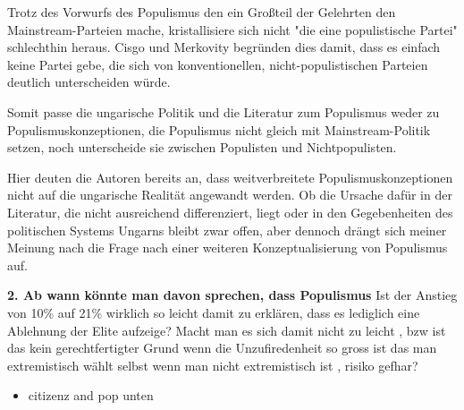 \documentclass[11pt]{report}
\begin{document}
Trotz des Vorwurfs des Populismus den ein Großteil der Gelehrten den Mainstream-Parteien mache, kristallisiere sich nicht "die eine populistische Partei" schlechthin heraus. Cisgo und Merkovity begründen dies damit, dass es einfach keine Partei gebe, die sich von konventionellen, nicht-populistischen Parteien deutlich unterscheiden würde.

Somit passe die ungarische Politik und die Literatur zum Populismus weder zu Populismuskonzeptionen, die Populismus nicht gleich mit Mainstream-Politik setzen, noch unterscheide sie zwischen Populisten und Nichtpopulisten.

Hier deuten die Autoren bereits an, dass weitverbreitete Populismuskonzeptionen nicht auf die ungarische Realität angewandt werden. Ob die Ursache dafür in der Literatur, die nicht ausreichend differenziert, liegt oder in den Gegebenheiten des politischen Systems Ungarns bleibt zwar offen, aber dennoch drängt sich meiner Meinung nach die Frage nach einer weiteren Konzeptualisierung von Populismus auf.


\textbf{2. Ab wann könnte man davon sprechen, dass Populismus} 
Ist der Anstieg von 10\% auf 21\% wirklich so leicht damit zu erklären, dass es lediglich eine Ablehnung der Elite aufzeige? Macht man es sich damit nicht zu leicht , bzw ist das kein gerechtfertigter Grund wenn die Unzufiredenheit so gross ist das man extremistisch wählt selbst wenn man nicht extremistisch ist , risiko gefhar?
\begin{itemize}
\item citizenz and pop unten
\end{itemize}
\end{document}
